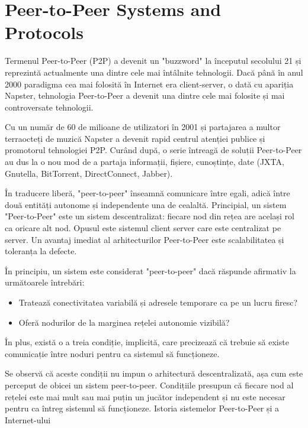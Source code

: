 
\chapter{Peer-to-Peer Systems and Protocols}
\label{chapter:p2p-systems}

Termenul Peer-to-Peer (P2P) a devenit un "buzzword" la începutul secolului 21
și reprezintă actualmente una dintre cele mai întâlnite tehnologii. Dacă până
în anul 2000 paradigma cea mai folosită în Internet era client-server, o dată
cu apariția Napster, tehnologia Peer-to-Peer a devenit una dintre cele mai
folosite și mai controversate tehnologii.

Cu un număr de 60 de milioane de utilizatori în 2001 și partajarea  a multor
terraocteți de muzică Napster a devenit rapid centrul atenției publice și
promotorul tehnologiei P2P. Curând după, o serie întreagă de soluții
Peer-to-Peer au dus la o nou mod de a partaja informații, fișiere, cunoștințe,
date (JXTA, Gnutella, BitTorrent, DirectConnect, Jabber).

În traducere liberă, "peer-to-peer" înseamnă comunicare între egali, adică
între două entități autonome și independente una de cealaltă. Principial, un
sistem "Peer-to-Peer" este un sistem descentralizat: fiecare nod din rețea are
același rol ca oricare alt nod. Opusul este sistemul client server care este
centralizat pe server. Un avantaj imediat al arhitecturilor Peer-to-Peer este
scalabilitatea și toleranța la defecte.

În principiu, un sistem este considerat "peer-to-peer" dacă răspunde afirmativ
la următoarele întrebări:
\begin{itemize}
  \item Tratează conectivitatea variabilă și adresele temporare ca pe un lucru
  firesc?
  \item Oferă nodurilor de la marginea rețelei autonomie vizibilă?
\end{itemize}

În plus, există o a treia condiție, implicită, care precizează că trebuie să
existe comunicație între noduri pentru ca sistemul să funcționeze.

Se observă că aceste condiții nu impun o arhitectură descentralizată, așa cum
este perceput de obicei un sistem peer-to-peer. Condițiile presupun că fiecare
nod al rețelei este mai mult sau mai puțin un jucător independent și nu este
necesar pentru ca întreg sistemul să funcționeze.  Istoria sistemelor
Peer-to-Peer și a Internet-ului

